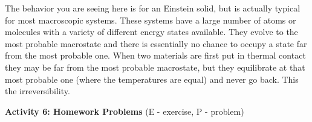 The behavior you are seeing here is for an Einstein solid, but is actually typical for
most macroscopic systems. These systems have a large number of atoms or molecules
with a variety of different energy states available.
They evolve to the most probable macrostate and there is essentially no chance to occupy a state
far from the most probable one. 
When two materials are first put in thermal contact they may be far from the most probable 
macrostate, but they equilibrate at that most probable one (where the temperatures are equal)
and never go back.
This the irreversibility.

\vspace{15mm}


\bigskip

\textbf{Activity 6: Homework Problems} (E - exercise, P - problem)

